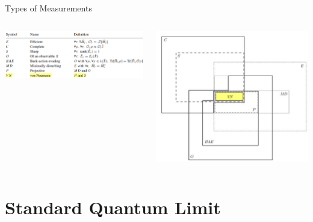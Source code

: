 \documentclass[
]{beamer}
\begin{document}
		




{
	\begin{frame}[plain]{}\end{frame}
}

\begin{frame}{Types of Measurements}
	\begin{columns}
		\includegraphics[width=\textwidth]{figures/types_table.png}

		\includegraphics[width=\textwidth]{figures/types_ven.png}
	\end{columns}
\end{frame}

\section{Standard Quantum Limit}

\end{document}

